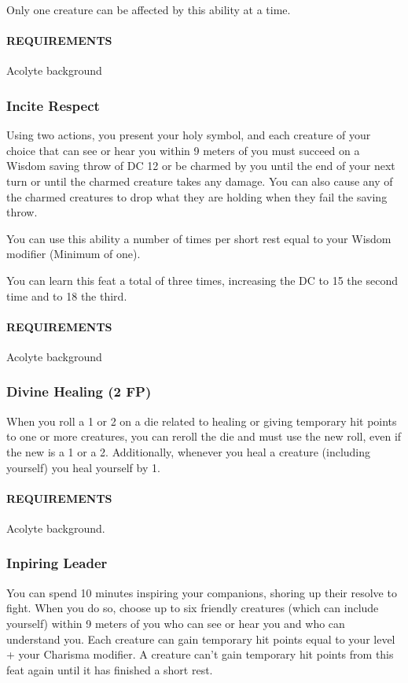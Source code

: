         Only one creature can be affected by this ability at a time.
        \paragraph{REQUIREMENTS} Acolyte background

    \subsubsection{Incite Respect} \label{feat::inciterespect}
        Using two actions, you present your holy symbol, and each creature of your choice that can see or hear you within 9 meters of you must succeed on a Wisdom saving throw of DC 12 or be charmed by you until the end of your next turn or until the charmed creature takes any damage.
        You can also cause any of the charmed creatures to drop what they are holding when they fail the saving throw.

        You can use this ability a number of times per short rest equal to your Wisdom modifier (Minimum of one).

        You can learn this feat a total of three times, increasing the DC to 15 the second time and to 18 the third.
        \paragraph{REQUIREMENTS} Acolyte background

    \subsubsection{Divine Healing (2 FP)} \label{feat::divinehealing}
        When you roll a 1 or 2 on a die related to healing or giving temporary hit points to one or more creatures, you can reroll the die and must use the new roll, even if the new is a 1 or a 2.
        Additionally, whenever you heal a creature (including yourself) you heal yourself by 1.
        \paragraph{REQUIREMENTS} Acolyte background.

    \subsubsection{Inpiring Leader} \label{feat::inspiringleader}
        You can spend 10 minutes inspiring your companions, shoring up their resolve to fight.
        When you do so, choose up to six friendly creatures (which can include yourself) within 9 meters of you who can see or hear you and who can understand you.
        Each creature can gain temporary hit points equal to your level + your Charisma modifier.
        A creature can't gain temporary hit points from this feat again until it has finished a short rest.
